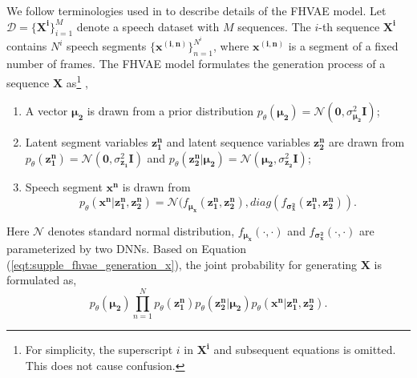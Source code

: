 \documentclass[transmag]{IEEEtran}
\begin{document}
We follow terminologies used in \cite{hsu2017nips} to describe details of the FHVAE model. Let $\mathcal{D}=\{\bm{X^{i}}\}_{i=1}^{M}$ denote a speech dataset with $M$ sequences. 
The $i$-th sequence $\bm{X^i}$ contains $N^i$ speech segments $\{\bm{x^{(i,n)}}\}^{N^i}_{n=1}$, where $\bm{x^{(i,n)}}$ is a segment of a fixed number of frames.
The FHVAE model formulates the generation process of a sequence $\bm{X}$ as\footnote{For simplicity, the superscript $i$ in $\bm{X^i}$ and  subsequent equations is omitted. This does not cause confusion.}  \cite{hsu2017nips},
\begin{enumerate}
    \item A vector $\bm{\mu_2 }$ is drawn from a prior distribution $p_{\theta}(\bm{\mu_2})=\mathcal{N} (\bm{0},\sigma^2_{\bm{\mu_2}} \bm{I})$;
    \item Latent segment variables $\bm{z_1 ^{n}} $ and latent sequence variables $\bm{z_2^{n}} $ are drawn from $p_{\theta}(\bm{z_1 ^{n}})=\mathcal{N} (\bm{0}, {\sigma^2_{\bm{z_1}}} \bm{I})$ and  $p_{\theta}(\bm{z_2 ^{n}| \bm{\mu_2}})=\mathcal{N}(\bm{\mu_2}, {\sigma^2_{\bm{z_2}}} \bm{I} )$;
    \item Speech segment $\bm{x^{n}}$ is drawn from \begin{equation}
    p_{\theta}(\bm{x^{n}}|\bm{z_1 ^{n}, \bm{z_2^{n}}})=\mathcal{N}(f_{\bm{\mu_x}} (\bm{z_1 ^{n}}, \bm{z_2^{n}}), diag(f_{\bm{\sigma^2_x}} (\bm{z_1 ^{n}}, \bm{z_2^{n}})). \label{eqt:supple_fhvae_generation_x}
        \end{equation}
\end{enumerate}

Here $\mathcal{N}$ denotes standard normal distribution, $ f_{\bm{\mu_x}} (\cdot, \cdot)$ and $ f_{\bm{\sigma^2_x}} (\cdot, \cdot)$ are parameterized by two DNNs.
Based on Equation (\ref{eqt:supple_fhvae_generation_x}), the joint probability for generating $\bm{X}$ is formulated as,
\begin{equation}
    p_{\theta} (\bm{\mu_2})\prod_{n=1}^{N} p_{\theta} (\bm{z_1^n}) p_{\theta} (\bm{z_2^{n}}|\bm{\mu_2})p_{\theta} (\bm{x^n}|\bm{z_1 ^{n}, \bm{z_2^{n}}}).
\end{equation}
\end{document}
